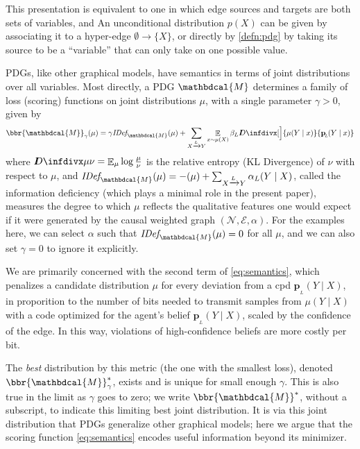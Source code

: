 \documentclass{article}
\theoremstyle{plain}
\theoremstyle{definition}
\let\H\relax
\DeclareMathOperator{\H}{\mathrm{H}} %
\DeclareMathOperator*{\Ex}{\mathbb{E}} %
\newcommand{\mat}[1]{\mathbf{#1}}
\newcommand{\thickD}{I\mkern-8muD}
\newcommand{\kldiv}{\thickD\infdivx}
\newcommand{\bp}[1][L]{\mat{p}_{\!_{#1}\!}}
\newcommand{\N}{\mathcal N}
\newcommand{\Ed}{\mathcal E}
\newcommand{\dg}[1]{\mathbdcal{#1}}
\newcommand{\IDef}[1]{\mathit{IDef}_{\!#1}}
\newcommand{\ed}[3]{%
		\mathchoice%
		{#2\overset{\smash{\mskip-5mu\raisebox{-3pt}{${#1}$}}}{\xrightarrow{\hphantom{\scriptstyle {#1}}}} #3} %
		{#2\overset{\smash{\mskip-5mu\raisebox{-3pt}{$\scriptstyle {#1}$}}}{\xrightarrow{\hphantom{\scriptstyle {#1}}}} #3}%
		{#2\overset{\smash{\mskip-5mu\raisebox{-3pt}{$\scriptscriptstyle {#1}$}}}{\xrightarrow{\hphantom{\scriptscriptstyle {#1}}}} #3} %
		{#2\overset{\smash{\mskip-5mu\raisebox{-3pt}{$\scriptscriptstyle {#1}$}}}{\xrightarrow{\hphantom{\scriptscriptstyle {#1}}}} #3}} %
\begin{document}
This presentation is equivalent to one in which edge sources and targets are both sets of variables, and 
An unconditional distribution $p(X)$ can be given by associating it to a hyper-edge $\emptyset \to \{X\}$, or directly by \cref{defn:pdg} by taking its source to be a ``variable'' that can only take on one possible value.

PDGs, like other graphical models, have semantics in terms of joint distributions over all variables.
Most directly, a PDG $\dg M$ determines a family of loss (scoring) functions on joint distributions $\mu$, with a single parameter $\gamma > 0$, given by
\begin{equation}
	\bbr{\dg M}_\gamma(\mu) = \gamma \IDef{\dg M}(\mu) +  \sum_{\ed LXY} \Ex_{x \sim \mu(X)} \beta_L \kldiv[\Big]{\mu(Y\mid x)}{\bp(Y \mid x)}
	\label{eq:semantics}
\end{equation}
where $\kldiv\mu\nu = \Ex_\mu \log \frac{\mu}{\nu}$ is the relative entropy (KL Divergence) of $\nu$ with respect to $\mu$, and $\IDef{\dg M}(\mu) = - \H(\mu) + \sum_{\ed LXY} \alpha_L \H(Y \mid X)$, called the information deficiency (which plays a minimal role in the present paper),  measures the degree to which $\mu$ reflects the qualitative features one would expect if it were generated by the causal weighted graph $(\N, \Ed, \alpha)$.
For the examples here, we can select $\alpha$ such that $\IDef{\dg M}(\mu) = 0$ for all $\mu$, and we can also set $\gamma=0$ to ignore it explicitly.

We are primarily concerned with the second term of \eqref{eq:semantics}, which penalizes a candidate distribution $\mu$ for every deviation from a cpd $\bp[L](Y\mid X)$, in proporition to the number of bits needed to transmit samples from $\mu(Y\mid X)$ with a code optimized for the agent's belief $\bp[L](Y\mid X)$, scaled by the confidence of the edge. In this way, violations of high-confidence beliefs are more costly per bit.

The \emph{best} distribution by this metric (the one with the smallest loss), denoted $\bbr{\dg M}_\gamma^*$,
exists and is unique for small enough $\gamma$. 
This is also true in the limit as $\gamma$ goes to zero;
we write $\bbr{\dg M}^*$, without a subscript, to indicate this limiting best joint distribution.
It is via this joint distribution that PDGs generalize other graphical models; here we argue that the scoring function \eqref{eq:semantics} encodes useful information beyond its minimizer. 
\end{document}
